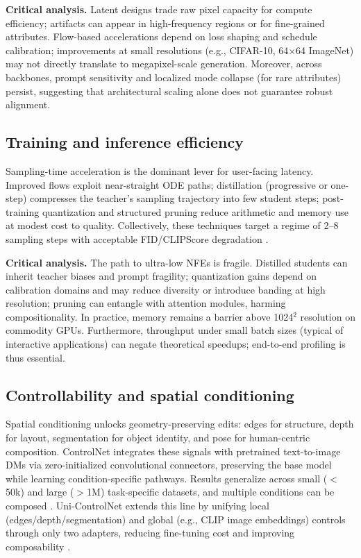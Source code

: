 \documentclass[conference]{IEEEtran}
\begin{document}
\textbf{Critical analysis.} Latent designs trade raw pixel capacity for compute efficiency; artifacts can appear in high-frequency regions or for fine-grained attributes. Flow-based accelerations depend on loss shaping and schedule calibration; improvements at small resolutions (e.g., CIFAR-10, 64$\times$64 ImageNet) may not directly translate to megapixel-scale generation. Moreover, across backbones, prompt sensitivity and localized mode collapse (for rare attributes) persist, suggesting that architectural scaling alone does not guarantee robust alignment.

\subsection{Training and inference efficiency}
Sampling-time acceleration is the dominant lever for user-facing latency. Improved flows exploit near-straight ODE paths; distillation (progressive or one-step) compresses the teacher’s sampling trajectory into few student steps; post-training quantization and structured pruning reduce arithmetic and memory use at modest cost to quality. Collectively, these techniques target a regime of 2--8 sampling steps with acceptable FID/CLIPScore degradation \cite{Lee2024RectifiedArxiv}. 

\textbf{Critical analysis.} The path to ultra-low NFEs is fragile. Distilled students can inherit teacher biases and prompt fragility; quantization gains depend on calibration domains and may reduce diversity or introduce banding at high resolution; pruning can entangle with attention modules, harming compositionality. In practice, memory remains a barrier above 1024$^2$ resolution on commodity GPUs. Furthermore, throughput under small batch sizes (typical of interactive applications) can negate theoretical speedups; end-to-end profiling is thus essential.

\subsection{Controllability and spatial conditioning}
Spatial conditioning unlocks geometry-preserving edits: edges for structure, depth for layout, segmentation for object identity, and pose for human-centric composition. ControlNet integrates these signals with pretrained text-to-image DMs via zero-initialized convolutional connectors, preserving the base model while learning condition-specific pathways. Results generalize across small ($<\!$50k) and large ($>\!$1M) task-specific datasets, and multiple conditions can be composed \cite{Zhang2023ControlNet}. Uni-ControlNet extends this line by unifying local (edges/depth/segmentation) and global (e.g., CLIP image embeddings) controls through only two adapters, reducing fine-tuning cost and improving composability \cite{Zhao2023UniControlNet}. 
\end{document}
